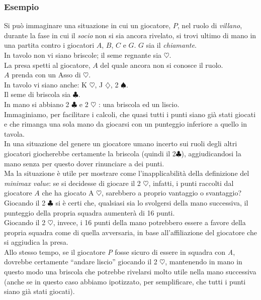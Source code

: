 \subsubsection*{Esempio}
Si può immaginare una situazione in cui un giocatore, $P$, nel ruolo di \emph{villano}, durante la fase in cui il \emph{socio} non si sia ancora rivelato, si trovi ultimo di mano in una partita contro i giocatori $A$, $B$, $C$ e $G$. $G$ sia il \emph{chiamante}.\\
In tavolo non vi siano briscole; il seme regnante sia $\heartsuit$.\\
La presa spetti al giocatore, $A$ del quale ancora non si conosce il ruolo.\\
$A$ prenda con un Asso di $\heartsuit$.\\
In tavolo vi siano anche: K $\heartsuit$, J $\diamondsuit$, 2 $\spadesuit$.\\
Il seme di briscola sia $\clubsuit$.\\
In mano si abbiano 2 $\clubsuit$ e 2 $\heartsuit$ : una briscola ed un liscio.\\
Immaginiamo, per facilitare i calcoli, che quasi tutti i punti siano già stati giocati e che rimanga una sola mano da giocarsi con un punteggio inferiore a quello in tavola.\\
In una situazione del genere un giocatore umano incerto sui ruoli degli altri giocatori giocherebbe certamente la briscola (quindi il 2$\clubsuit$), aggiudicandosi la mano senza per questo dover rinunciare a dei punti.\\
Ma la situazione è utile per mostrare come l'inapplicabilità della definizione del \emph{minimax value}: se si decidesse di giocare il 2 $\heartsuit$, infatti, i punti raccolti dal giocatore $A$ che ha giocato A $\heartsuit$, sarebbero a proprio vantaggio o svantaggio?\\
Giocando il 2 $\clubsuit$ si è certi che, qualsiasi sia lo svolgersi della mano successiva, il punteggio della propria squadra aumenterà di 16 punti.\\
Giocando il 2 $\heartsuit$, invece, i 16 punti della mano potrebbero essere a favore della propria squadra come di quella avversaria, in base all'affiliazione del giocatore che si aggiudica la presa.\\
Allo stesso tempo, se il giocatore \emph{P} fosse sicuro di essere in squadra con \emph{A}, dovrebbe certamente ``andare liscio'' giocando il 2 $\heartsuit$, mantenendo in mano in questo modo una briscola che potrebbe rivelarsi molto utile nella mano successiva (anche se in questo caso abbiamo ipotizzato, per semplificare, che tutti i punti siano già stati giocati).


